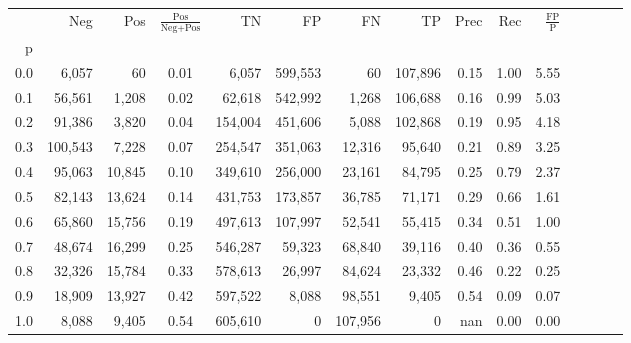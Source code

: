 \begin{tabular}{rrrcrrrrrrrrrrr}
\toprule
{} &      Neg &     Pos & $\frac{\text{Pos}}{\text{Neg}+\text{Pos}}$ &       TN &       FP &       FN &       TP &  Prec &   Rec & $\frac{\text{FP}}{\text{P}}$ \\
p   &          &         &                                            &          &          &          &          &       &       &                              \\
\midrule
0.0 &    6,057 &      60 &                                       0.01 &    6,057 &  599,553 &       60 &  107,896 &  0.15 &  1.00 &                         5.55 \\
0.1 &   56,561 &   1,208 &                                       0.02 &   62,618 &  542,992 &    1,268 &  106,688 &  0.16 &  0.99 &                         5.03 \\
0.2 &   91,386 &   3,820 &                                       0.04 &  154,004 &  451,606 &    5,088 &  102,868 &  0.19 &  0.95 &                         4.18 \\
0.3 &  100,543 &   7,228 &                                       0.07 &  254,547 &  351,063 &   12,316 &   95,640 &  0.21 &  0.89 &                         3.25 \\
0.4 &   95,063 &  10,845 &                                       0.10 &  349,610 &  256,000 &   23,161 &   84,795 &  0.25 &  0.79 &                         2.37 \\
0.5 &   82,143 &  13,624 &                                       0.14 &  431,753 &  173,857 &   36,785 &   71,171 &  0.29 &  0.66 &                         1.61 \\
0.6 &   65,860 &  15,756 &                                       0.19 &  497,613 &  107,997 &   52,541 &   55,415 &  0.34 &  0.51 &                         1.00 \\
0.7 &   48,674 &  16,299 &                                       0.25 &  546,287 &   59,323 &   68,840 &   39,116 &  0.40 &  0.36 &                         0.55 \\
0.8 &   32,326 &  15,784 &                                       0.33 &  578,613 &   26,997 &   84,624 &   23,332 &  0.46 &  0.22 &                         0.25 \\
0.9 &   18,909 &  13,927 &                                       0.42 &  597,522 &    8,088 &   98,551 &    9,405 &  0.54 &  0.09 &                         0.07 \\
1.0 &    8,088 &   9,405 &                                       0.54 &  605,610 &        0 &  107,956 &        0 &   nan &  0.00 &                         0.00 \\
\bottomrule
\end{tabular}
